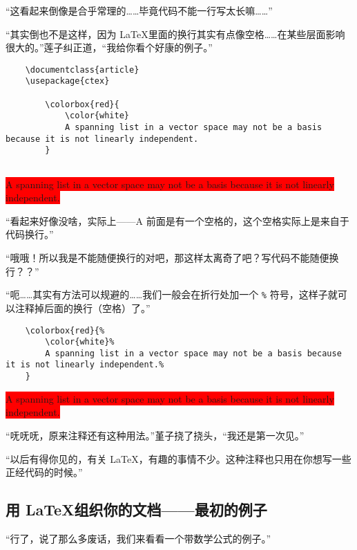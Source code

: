 “这看起来倒像是合乎常理的……毕竟代码不能一行写太长嘛……”

“其实倒也不是这样，因为 \LaTeX 里面的换行其实有点像空格……在某些层面影响很大的。”莲子纠正道，“我给你看个好康的例子。”


\begin{lstlisting}
    \documentclass{article}
    \usepackage{ctex}
    
        \colorbox{red}{
            \color{white} 
            A spanning list in a vector space may not be a basis because it is not linearly independent.
        }
    
\end{lstlisting}

\begin{center}\footnotesize
    \colorbox{red}{
        \color{white}
        A spanning list in a vector space may not be a basis because it is not linearly independent.
    }
\end{center}

“看起来好像没啥，实际上——A 前面是有一个空格的，这个空格实际上是来自于代码换行。”

“哦哦！所以我是不能随便换行的对吧，那这样太离奇了吧？写代码不能随便换行？？”

“呃……其实有方法可以规避的……我们一般会在折行处加一个 \verb"%" 符号，这样子就可以注释掉后面的换行（空格）了。”


\begin{lstlisting}
    \colorbox{red}{%
        \color{white}%
        A spanning list in a vector space may not be a basis because it is not linearly independent.%
    }
\end{lstlisting}

\begin{center}\footnotesize
    \colorbox{red}{%
        \color{white}%
        A spanning list in a vector space may not be a basis because it is not linearly independent.%
    }
\end{center}

“呒呒呒，原来注释还有这种用法。”堇子挠了挠头，“我还是第一次见。”

“以后有得你见的，有关 \LaTeX，有趣的事情不少。这种注释也只用在你想写一些正经代码的时候。”

\subsection{用 \LaTeX 组织你的文档——最初的例子}

“行了，说了那么多废话，我们来看看一个带数学公式的例子。”

